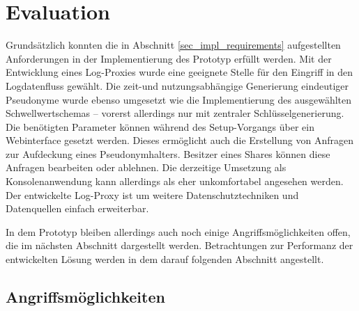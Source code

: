 \section{Evaluation}

\label{sec_impl_evaluation}


Grundsätzlich konnten die in Abschnitt \ref{sec_impl_requirements} aufgestellten Anforderungen in der Implementierung des Prototyp erfüllt werden. Mit der Entwicklung eines Log-Proxies wurde eine geeignete Stelle für den Eingriff in den Logdatenfluss gewählt. Die zeit-und nutzungsabhängige Generierung eindeutiger Pseudonyme wurde ebenso umgesetzt wie die Implementierung des ausgewählten Schwellwertschemas -- vorerst allerdings nur mit zentraler Schlüsselgenerierung.\\
Die benötigten Parameter können während des Setup-Vorgangs über ein Webinterface gesetzt werden. Dieses ermöglicht auch die Erstellung von Anfragen zur Aufdeckung eines Pseudonymhalters. Besitzer eines Shares können diese Anfragen bearbeiten oder ablehnen. Die derzeitige Umsetzung als Konsolenanwendung kann allerdings als eher unkomfortabel angesehen werden. Der entwickelte Log-Proxy ist um weitere Datenschutztechniken und Datenquellen einfach erweiterbar.

In dem Prototyp bleiben allerdings auch noch einige Angriffsmöglichkeiten offen, die im nächsten Abschnitt dargestellt werden. Betrachtungen zur Performanz der entwickelten Lösung werden in dem darauf folgenden Abschnitt angestellt.

\subsection{Angriffsmöglichkeiten}


